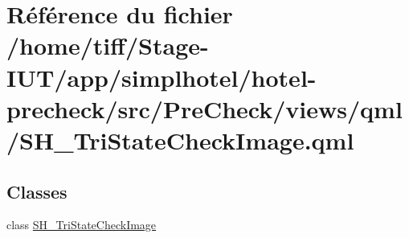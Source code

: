 \hypertarget{SH__TriStateCheckImage_8qml}{\section{Référence du fichier /home/tiff/\-Stage-\/\-I\-U\-T/app/simplhotel/hotel-\/precheck/src/\-Pre\-Check/views/qml/\-S\-H\-\_\-\-Tri\-State\-Check\-Image.qml}
\label{SH__TriStateCheckImage_8qml}
}
\subsection*{Classes}
\begin{DoxyCompactItemize}
\item 
class \hyperlink{classSH__TriStateCheckImage}{S\-H\-\_\-\-Tri\-State\-Check\-Image}
\end{DoxyCompactItemize}
